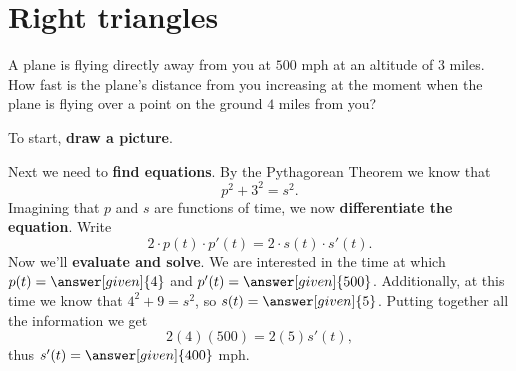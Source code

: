 \documentclass{ximera}
\begin{document}
\section{Right triangles}

\begin{example}
A plane is flying directly away from you at $500$ mph at an altitude
of $3$ miles.  How fast is the plane's distance from you increasing at
the moment when the plane is flying over a point on the ground $4$
miles from you?


\begin{explanation}
To start, \textbf{draw a picture}.
\begin{image}
\end{image}
Next we need to \textbf{find equations}. By the Pythagorean Theorem
we know that
\[
p^2+3^2=s^2.
\] 
Imagining that $p$ and $s$ are functions of time, we now
\textbf{differentiate the equation}. Write
\[
2\cdot p(t)\cdot p'(t)  = 2\cdot s(t) \cdot s'(t).
\] 
Now we'll \textbf{evaluate and solve}.  We
are interested in the time at which $p(t)=\answer[given]{4}$ and $p'(t) =
\answer[given]{500}$. Additionally, at this time we know that $4^2+9=s^2$, so
$s(t)=\answer[given]{5}$.  Putting together all the information we get
\[
2(4)(500)=2(5)s'(t),
\]
thus $s'(t)=\answer[given]{400}$ mph.
\end{explanation}
\end{example}
\end{document}
